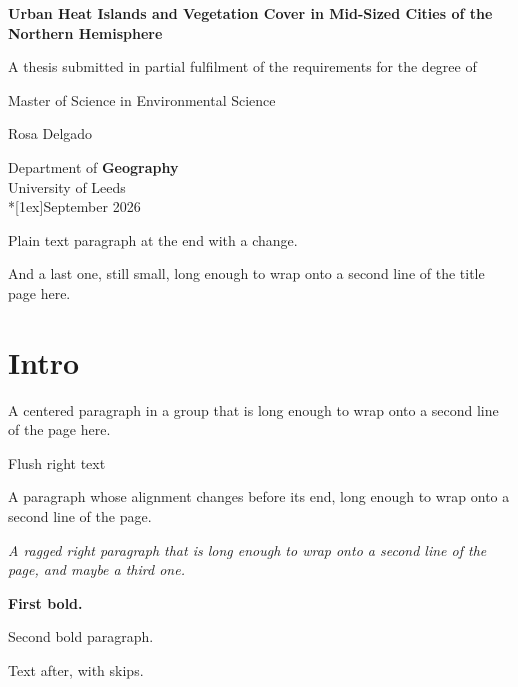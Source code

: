 \documentclass[11pt,twoside]{report}
\begin{document}
\begin{titlepage}
  \centering
  \vspace*{2cm}
  {\LARGE\bfseries Urban Heat Islands and Vegetation Cover in Mid-Sized Cities of the Northern Hemisphere\par}
  \vspace{2cm}
  {\large A thesis submitted in partial fulfilment of the requirements for the degree of\par}
  {\large Master of Science in Environmental Science\par}
  \vspace{2cm}
  {\Large\null Rosa Delgado\par}
  \null
  \vfill
  {\large Department of \textbf{Geography} \\University of Leeds\quad\quad \\*[1ex]September 2026\par}
  \bigskip
  Plain text paragraph at the end \small with a change.\par
  And a last one, still small, long enough to wrap onto a second line of the title page here.
\end{titlepage}

\chapter{Intro}
{\centering A centered paragraph in a group that is long enough to wrap onto a second line of the page here.\par}
{\raggedleft Flush right text\par}
{A paragraph whose alignment changes before its end, long enough to wrap onto a second line \centering of the page.\par}
{\raggedright\itshape A ragged right paragraph that is long enough to wrap onto a second line of the page, and maybe a third one.\par}
{\bfseries First bold.\par Second bold paragraph.\par}
\medskip
Text after, \smallskip{} with skips.
\end{document}
